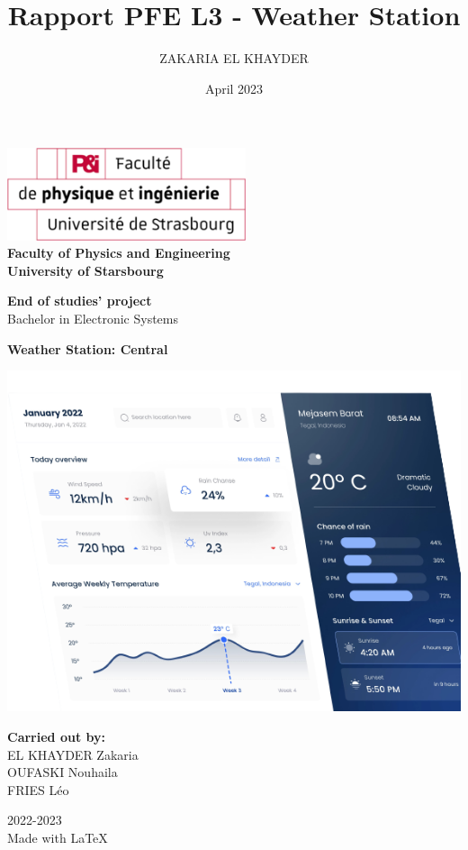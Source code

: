 \documentclass{article}
\title{Rapport PFE L3 - Weather Station}
\author{ZAKARIA EL KHAYDER}
\date{April 2023}
\begin{document}
\makeatletter
\begin{titlepage}
\begin{center}
    
\includegraphics[width=7cm]{images/faculty_logo.png}
\\[1cm]
\textbf{\large{
    Faculty of Physics and Engineering \\
    University of Starsbourg 
}}

\vfill

\large{
\textbf{End of studies' project} \\[14pt]
Bachelor in Electronic Systems
}

\textbf{\large{
Weather Station: Central
}}

\vfill

\includegraphics[width=.8\textwidth]{images/website/inspiration_bg.png}

\vfill

\textbf{Carried out by:}\\
EL KHAYDER Zakaria \\
OUFASKI Nouhaila \\
FRIES Léo

\vfill

\large{
    2022-2023
    \\[4pt]
    Made with \LaTeX
}


\end{center}
\end{titlepage}
\makeatother
\newpage
\end{document}
